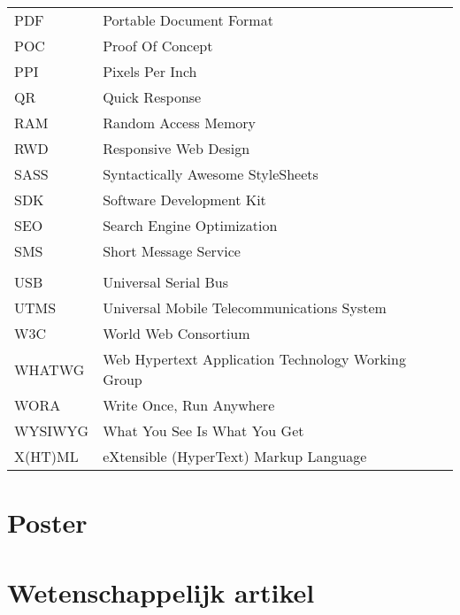 \documentclass[master=cws,dutch,masteroption={vs,gs},inputenc=utf8]{kulemt}
\begin{document}
\begin{flushleft}
\begin{longtable}{p{2cm} l}
     PDF & Portable Document Format \\
     POC & Proof Of Concept \\
     PPI & Pixels Per Inch \\
     QR & Quick Response \\
     RAM & Random Access Memory \\
     RWD & Responsive Web Design \\
     SASS & Syntactically Awesome StyleSheets \\
     SDK & Software Development Kit \\
     SEO & Search Engine Optimization \\
     SMS & Short Message Service \\
     \sta{} & \st{} \\
     USB & Universal Serial Bus \\
     UTMS & Universal Mobile Telecommunications System \\
     W3C & World Web Consortium \\
     WHATWG & Web Hypertext Application Technology Working Group \\
     WORA & Write Once, Run Anywhere \\
     WYSIWYG & What You See Is What You Get \\
     X(HT)ML & eXtensible (HyperText) Markup Language \\ 
  \end{longtable}
\end{flushleft}

\mainmatter













\appendixpage*          
\appendix
\chapter{Poster}

\chapter{Wetenschappelijk artikel}




\backmatter
\makeatletter
\g@addto@macro{\UrlBreaks}{\UrlOrds}
\makeatother


\end{document}
